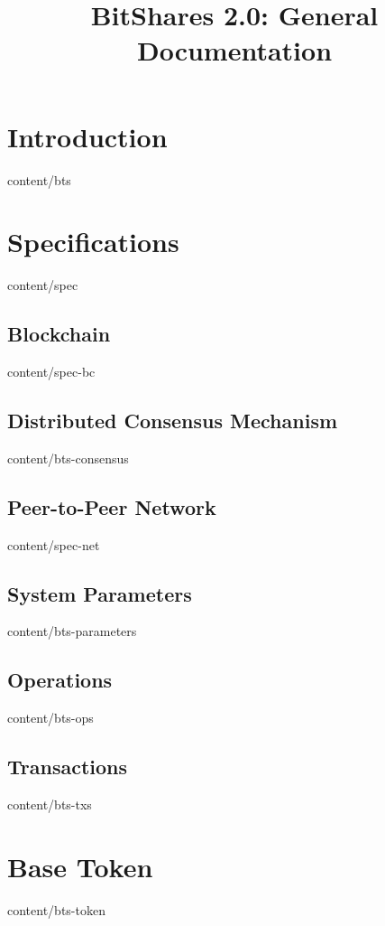 \documentclass[conference,final,10pt,a4paper]{IEEEtran}
\title{BitShares 2.0: General Documentation}
\begin{document}
\sloppy
\maketitle

\begin{abstract}
\end{abstract}
\section       { Introduction                    }  { content/bts                } 

\section       { Specifications                  }  { content/spec               } 
\subsection    { Blockchain                      }  { content/spec-bc            } 
\subsection    { Distributed Consensus Mechanism }  { content/bts-consensus      } 
\subsection    { Peer-to-Peer Network            }  { content/spec-net           } 
\subsection    { System Parameters               }  { content/bts-parameters     } 
\subsection    { Operations                      }  { content/bts-ops            } 
\subsection    { Transactions                    }  { content/bts-txs            } 

\section       { Base Token                      }  { content/bts-token          } 
\end{document}
